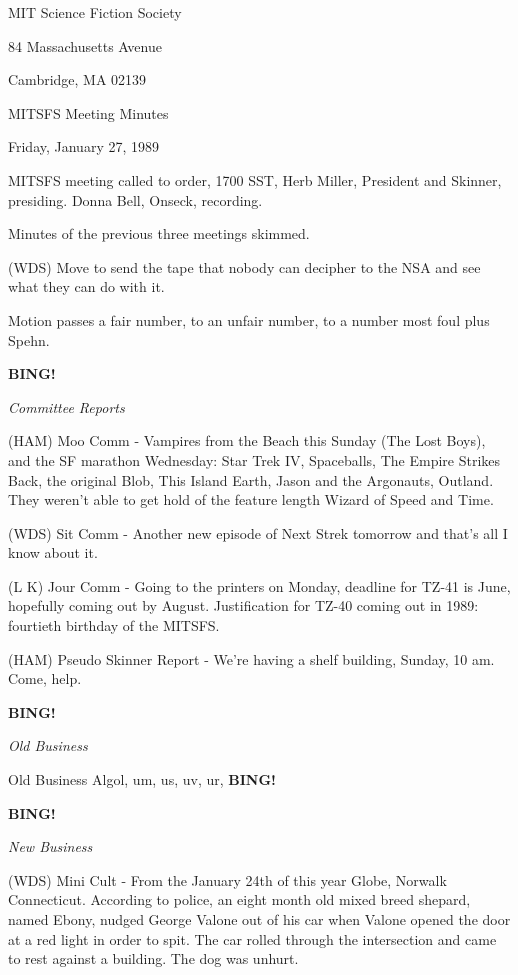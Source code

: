 \documentclass[12pt]{article}
\newcommand{\bing}{{\bf BING!} }
\newcommand{\goto}[1]{\bing \vskip 12pt \centerline{{\em{#1}}}}
\begin{document}
\begin{center}

MIT Science Fiction Society 

84 Massachusetts Avenue

Cambridge, MA 02139

\vspace{12pt}

MITSFS Meeting Minutes 

Friday, January 27, 1989

\end{center}
 
\vspace{18pt}

\setlength{\parskip}{6pt}

\noindent
MITSFS meeting called to order, 1700 SST, Herb Miller, President and Skinner, presiding. Donna Bell, Onseck, recording.

Minutes of the previous three meetings skimmed.

(WDS) Move to send the tape that nobody can decipher to the NSA and see what they can do with it.

Motion passes a fair number, to an unfair number, to a number most foul plus Spehn.

\goto{Committee Reports}

(HAM) Moo Comm - Vampires from the Beach this Sunday (The Lost Boys), and the SF marathon Wednesday: Star Trek IV, Spaceballs, The Empire Strikes Back, the original Blob, This Island Earth, Jason and the Argonauts, Outland.  They weren't able to get hold of the feature length Wizard of Speed and Time.

(WDS) Sit Comm - Another new episode of Next Strek tomorrow and that's all I know about it.

(L K) Jour Comm - Going to the printers on Monday, deadline for TZ-41 is June, hopefully coming out by August. Justification for TZ-40 coming out in 1989: fourtieth birthday of the MITSFS.

(HAM) Pseudo Skinner Report - We're having a shelf building, Sunday, 10 am.  Come, help.

\goto{Old Business}

Old Business Algol, um, us, uv, ur, \bing

\goto{New Business}

(WDS) Mini Cult - From the January 24th of this year Globe, Norwalk Connecticut. According to police, an eight month old mixed breed shepard, named Ebony, nudged George Valone out of his car when Valone opened the door at a red light in order to spit. The car rolled through the intersection and came to rest against a building. The dog was unhurt.
\end{document}
